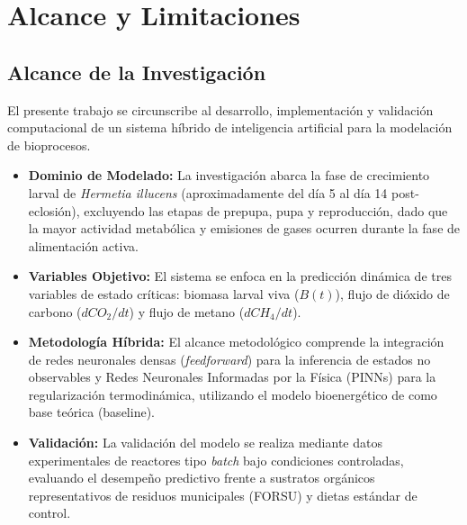 \section{Alcance y Limitaciones}

\subsection{Alcance de la Investigación}
El presente trabajo se circunscribe al desarrollo, implementación y validación computacional de un sistema híbrido de inteligencia artificial para la modelación de bioprocesos.
\begin{itemize}
    \item \textbf{Dominio de Modelado:} La investigación abarca la fase de crecimiento larval de \textit{Hermetia illucens} (aproximadamente del día 5 al día 14 post-eclosión), excluyendo las etapas de prepupa, pupa y reproducción, dado que la mayor actividad metabólica y emisiones de gases ocurren durante la fase de alimentación activa.
    \item \textbf{Variables Objetivo:} El sistema se enfoca en la predicción dinámica de tres variables de estado críticas: biomasa larval viva ($B(t)$), flujo de dióxido de carbono ($dCO_2/dt$) y flujo de metano ($dCH_4/dt$).
    \item \textbf{Metodología Híbrida:} El alcance metodológico comprende la integración de redes neuronales densas (\textit{feedforward}) para la inferencia de estados no observables y Redes Neuronales Informadas por la Física (PINNs) para la regularización termodinámica, utilizando el modelo bioenergético de \textcite{eriksenDynamicModellingFeed2022} como base teórica (baseline).
    \item \textbf{Validación:} La validación del modelo se realiza mediante datos experimentales de reactores tipo \textit{batch} bajo condiciones controladas, evaluando el desempeño predictivo frente a sustratos orgánicos representativos de residuos municipales (FORSU) y dietas estándar de control.
\end{itemize}

